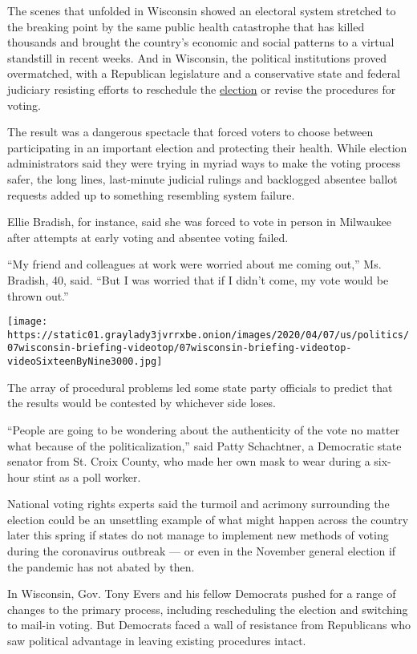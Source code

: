 The scenes that unfolded in Wisconsin showed an electoral system
stretched to the breaking point by the same public health catastrophe
that has killed thousands and brought the country's economic and social
patterns to a virtual standstill in recent weeks. And in Wisconsin, the
political institutions proved overmatched, with a Republican legislature
and a conservative state and federal judiciary resisting efforts to
reschedule the
\href{https://www.nytimes3xbfgragh.onion/interactive/2020/05/12/us/elections/live-updates-california-wisconsin-special-election.html}{election}
or revise the procedures for voting.

The result was a dangerous spectacle that forced voters to choose
between participating in an important election and protecting their
health. While election administrators said they were trying in myriad
ways to make the voting process safer, the long lines, last-minute
judicial rulings and backlogged absentee ballot requests added up to
something resembling system failure.

Ellie Bradish, for instance, said she was forced to vote in person in
Milwaukee after attempts at early voting and absentee voting failed.

``My friend and colleagues at work were worried about me coming out,''
Ms. Bradish, 40, said. ``But I was worried that if I didn't come, my
vote would be thrown out.''

\texttt{[image: https://static01.graylady3jvrrxbe.onion/images/2020/04/07/us/politics/07wisconsin-briefing-videotop/07wisconsin-briefing-videotop-videoSixteenByNine3000.jpg]}

The array of procedural problems led some state party officials to
predict that the results would be contested by whichever side loses.

``People are going to be wondering about the authenticity of the vote no
matter what because of the politicalization,'' said Patty Schachtner, a
Democratic state senator from St. Croix County, who made her own mask to
wear during a six-hour stint as a poll worker.

National voting rights experts said the turmoil and acrimony surrounding
the election could be an unsettling example of what might happen across
the country later this spring if states do not manage to implement new
methods of voting during the coronavirus outbreak --- or even in the
November general election if the pandemic has not abated by then.

In Wisconsin, Gov. Tony Evers and his fellow Democrats pushed for a
range of changes to the primary process, including rescheduling the
election and switching to mail-in voting. But Democrats faced a wall of
resistance from Republicans who saw political advantage in leaving
existing procedures intact.

